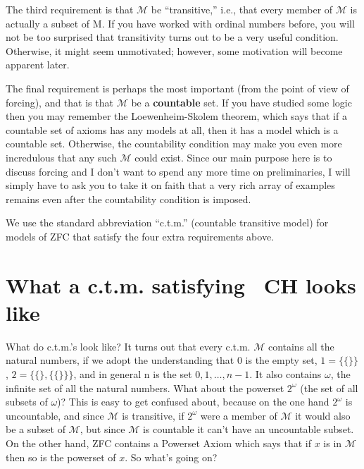 \documentclass[10pt]{article}
\newcommand\axiom[1]{\textmd{#1}}
\theoremstyle{definition}
\begin{document}
The third requirement is that $\mathcal{M}$ be ``transitive,'' i.e., that every member of $\mathcal M$ is actually a subset of M. If you have worked with ordinal numbers before, you will not be too surprised that transitivity turns out to be a very useful condition. Otherwise, it might seem unmotivated; however, some motivation will become apparent later.

The final requirement is perhaps the most important (from the point of view of forcing), and that is that $\mathcal{M}$ be a \textbf{countable} set. If you have studied some logic then you may remember the Loewenheim-Skolem theorem, which says that if a countable set of axioms has any models at all, then it has a model which is a countable set. Otherwise, the countability condition may make you even more incredulous that any such $\mathcal{M}$ could exist. Since our main purpose here is to discuss forcing and I don't want to spend any more time on preliminaries, I will simply have to ask you to take it on faith that a very rich array of examples remains even after the countability condition is imposed.

We use the standard abbreviation ``c.t.m.'' (countable transitive model) for models of \axiom{ZFC} that satisfy the four extra requirements above.


\section{What a c.t.m. satisfying \axiom{~CH} looks like}

What do c.t.m.'s look like? It turns out that every c.t.m. $\mathcal{M}$ contains all the natural numbers, if we adopt the understanding that 0 is the empty set, $1 = \{\{\}\}$, $2 = \{\{\}, \{\{\}\}\}$, and in general n is the set ${0, 1, \ldots, n-1}$. It also contains $\omega$, the infinite set of all the natural numbers. What about the powerset $2^\omega$ (the set of all subsets of $\omega$)? This is easy to get confused about, because on the one hand $2^\omega$ is uncountable, and since $\mathcal{M}$ is transitive, if $2^\omega$ were a member of $\mathcal M$ it would also be a subset of $\mathcal M$, but since $\mathcal{M}$ is countable it can't have an uncountable subset. On the other hand, \axiom{ZFC} contains a Powerset Axiom which says that if $x$ is in $\mathcal M$ then so is the powerset of $x$. So what's going on?
\end{document}
